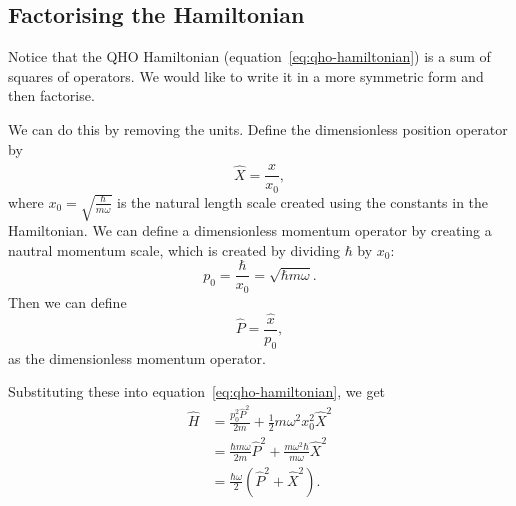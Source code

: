 \documentclass[../quantum_mechanics.tex]{subfiles}
\begin{document}
        \subsection{Factorising the Hamiltonian}\label{sec:solving-the-qho-with-ladder-operators:subsec:factorising-the-hamiltonian}
            Notice that the QHO Hamiltonian (equation~\ref{eq:qho-hamiltonian}) is a sum of squares of operators.
            We would like to write it in a more symmetric form and then factorise.

            We can do this by removing the units.
            Define the dimensionless position operator by
            \begin{equation}
                \hat{X}=\frac{\hat{x}}{x_0},
            \end{equation}
            where $x_0=\sqrt{\frac{\hbar}{m\omega}}$ is the natural length scale created using the constants in the Hamiltonian.
            We can define a dimensionless momentum operator by creating a nautral momentum scale, which is created by dividing $\hbar$ by $x_0$:
            \begin{equation}
                p_0=\frac{\hbar}{x_0}=\sqrt{\hbar m\omega}.
            \end{equation}
            Then we can define
            \begin{equation}
                \hat{P}=\frac{\hat{x}}{p_0},
            \end{equation}
            as the dimensionless momentum operator.

            Substituting these into equation~\ref{eq:qho-hamiltonian}, we get
            \begin{align}
                \hat{H}&=\frac{p_0^2\hat{P}^2}{2m}+\frac{1}{2}m\omega^2x_0^2\hat{X}^2\\
                &=\frac{\hbar m\omega}{2m}\hat{P}^2+\frac{m\omega^2\hbar}{m\omega}\hat{X}^2\\
                &=\frac{\hbar\omega}{2}(\hat{P}^2+\hat{X}^2).
            \end{align}
\end{document}
